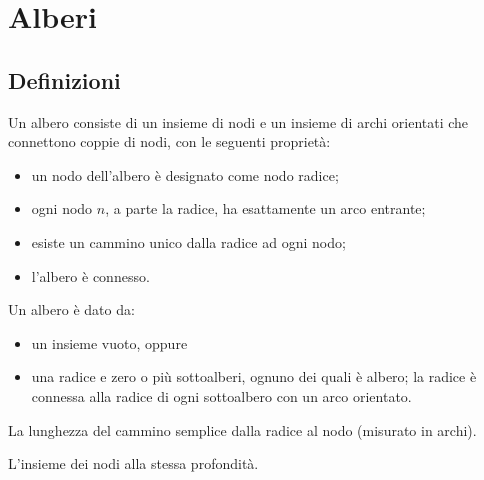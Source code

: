 
\ifsubfile
\usepackage{../settings/subfile}
\setcounter{chapter}{5}


\fi
\chapter{Alberi}


\section{Definizioni}

\begin{definition}
Un albero consiste di un insieme di nodi e un insieme di archi orientati che connettono coppie di nodi, con le seguenti proprietà:
\begin{itemize}
	\item un nodo dell'albero è designato come nodo radice;
	\item ogni nodo \(n\), a parte la radice, ha esattamente un arco entrante;
	\item esiste un cammino unico dalla radice ad ogni nodo;
	\item l'albero è connesso.
\end{itemize}
\end{definition}

\begin{definition}
Un albero è dato da:
\begin{itemize}
	\item un insieme vuoto, oppure
	\item una radice e zero o più sottoalberi, ognuno dei quali è albero; la radice è connessa alla radice di ogni sottoalbero con un arco orientato.
\end{itemize}
\end{definition}

\begin{definition}
La lunghezza del cammino semplice dalla radice al nodo (misurato in archi).
\end{definition}

\begin{definition}
L'insieme dei nodi alla stessa profondità.
\end{definition}

